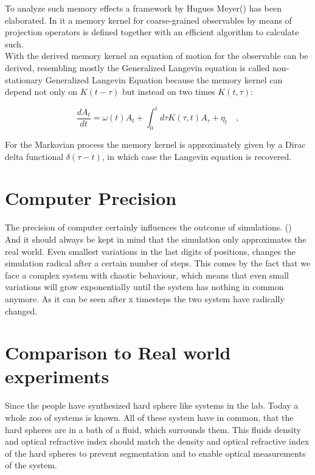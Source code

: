 To analyze such memory effects a framework by Hugues Meyer() has been elaborated. In it a memory kernel for coarse-grained observables by means of projection operators is defined together with an efficient algorithm to calculate such.\\
With the derived memory kernel an equation of motion for the observable can be derived, resembling mostly the Generalized Langevin equation is called non-stationary Generalized Langevin Equation because the memory kernel can depend not only on $K(t-\tau)$ but instead on two times $K(t,\tau)$:

\begin{equation}
\label{eqn:EOM_A}
  \frac{d A_{t}}{dt} = \omega (t) A_{t} + \int_{0}^{t} d\tau  K(\tau, t) A_{\tau} + \eta_{t} \quad ,
\end{equation}

For the Markovian process the memory kernel is approximately given by a Dirac delta functional $\delta(\tau-t)$, in which case the Langevin equation is recovered.


\section{Computer Precision}
\label{sec:precision}
The precision of computer certainly influences the outcome of simulations. ()\\
And it should always be kept in mind that the simulation only approximates the real world. Even smallest variations in the last digits of positions, changes the simulation radical after a certain number of steps. This comes by the fact that we face a complex system with chaotic behaviour, which means that even small variations will grow exponentially until the system has nothing in common anymore.  
As it can be seen after x timesteps the two system have radically changed.

\section{Comparison to Real world experiments} 
\label{sec:comparison}
Since the  people have synthesized hard sphere like systems in the lab. Today a whole zoo of systems is known. All of these system have in common, that the hard spheres are in a bath of a fluid, which surrounds them. This fluids density and optical refractive index should match the density and optical refractive index of the hard spheres to prevent segmentation and to enable optical measurements of the system. \\

